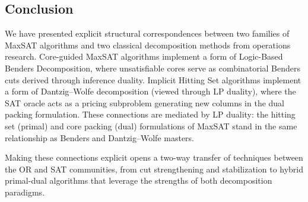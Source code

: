 \subsection{Conclusion}
\label{sec:conclusion}

We have presented explicit structural correspondences between two families of
MaxSAT algorithms and two classical decomposition methods from operations
research. Core-guided MaxSAT algorithms implement a form of Logic-Based
Benders Decomposition, where unsatisfiable cores serve as combinatorial
Benders cuts derived through inference duality. Implicit Hitting Set
algorithms implement a form of Dantzig--Wolfe decomposition (viewed through LP
duality), where the SAT oracle acts as a pricing subproblem generating new
columns in the dual packing formulation. These connections are mediated by LP
duality: the hitting set (primal) and core packing (dual) formulations of
MaxSAT stand in the same relationship as Benders and Dantzig--Wolfe masters.

Making these connections explicit opens a two-way transfer of techniques
between the OR and SAT communities, from cut strengthening and stabilization
to hybrid primal-dual algorithms that leverage the strengths of both
decomposition paradigms.
